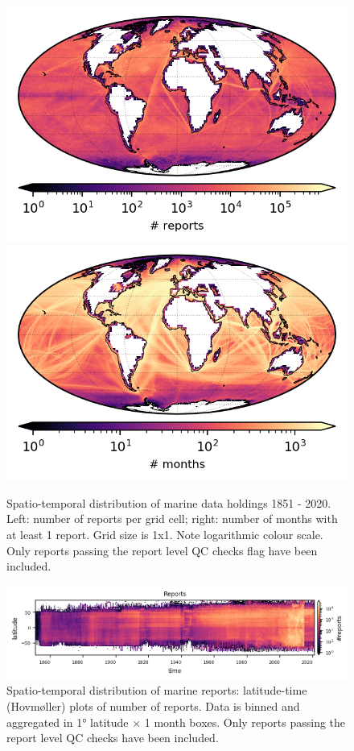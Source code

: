 \begin{figure} [h]
    \centering
    \includegraphics{resources/header-reports-map-optimal.png}
    \includegraphics{resources/header-months-map-optimal.png}
    \caption{Spatio-temporal distribution of marine data holdings 1851 - 2020. Left: number of reports per grid cell; right: number of months with at least 1 report. Grid size is 1x1. Note logarithmic colour scale. Only reports passing the report level QC checks flag have been included.}
    \label{fig:nreports-map}
\end{figure}

\begin{figure}
    \centering
    \includegraphics{resources/header-nreports_hovmoller_monthly}
    \caption{Spatio-temporal distribution of marine reports: latitude-time (Hovmøller) plots of number of reports. Data is binned and aggregated in 1° latitude × 1 month boxes. Only reports passing the report level QC checks have been included.}
    \label{fig:nreports-hovmoller}
\end{figure}

